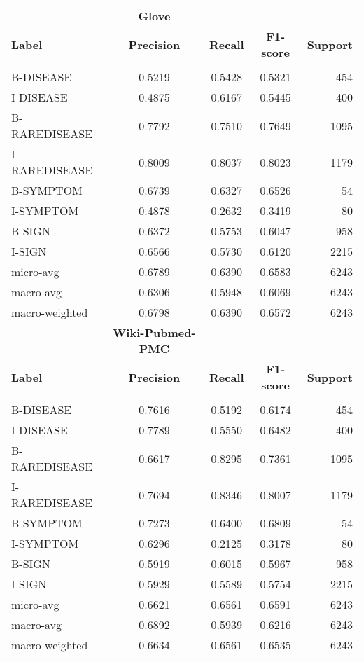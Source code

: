 \documentclass[preprint,12pt]{elsarticle}
\begin{document}
\begin{table}[H]
\begin{tabular}{lcccr}
\hline

& \multicolumn{1}{c}{\textbf{Glove}} \\
{\bf Label} & {\bf Precision} &
{\bf Recall} &
{\bf F1-score} & {\bf Support} \\
\hline\\[-8pt]
B-DISEASE	&	0.5219	&	0.5428	&	0.5321	&	454\\
I-DISEASE	&	0.4875	&	0.6167	&	0.5445	&	400\\
B-RAREDISEASE	&	0.7792	&	0.7510	&	0.7649	&	1095\\
I-RAREDISEASE	&	0.8009	&	0.8037	&	0.8023	&	1179\\
B-SYMPTOM	&	0.6739	&	0.6327	&	0.6526	&	54\\
I-SYMPTOM	&	0.4878	&	0.2632	&	0.3419	&	80\\
B-SIGN	&	0.6372	&	0.5753	&	0.6047	&	958\\
I-SIGN	&	0.6566	&	0.5730	&	0.6120	&	2215
\\micro-avg	&	0.6789	&	0.6390	&	0.6583	&	6243\\macro-avg	&	0.6306	&	0.5948	&	0.6069	&	6243\\
macro-weighted	&	0.6798	&	0.6390	&	0.6572	&	6243\\

\hline
& \multicolumn{1}{c}{\textbf{Wiki-Pubmed-PMC}} \\
{\bf Label} & {\bf Precision} &
{\bf Recall} &
{\bf F1-score} & {\bf Support} \\
\hline\\[-8pt]
B-DISEASE	&	0.7616	&	0.5192	&	0.6174	&	454\\
I-DISEASE	&	0.7789	&	0.5550	&	0.6482	&	400\\
B-RAREDISEASE	&	0.6617	&	0.8295	&	0.7361	&	1095\\
I-RAREDISEASE	&	0.7694	&	0.8346	&	0.8007	&	1179\\
B-SYMPTOM	&	0.7273	&	0.6400	&	0.6809	&	54\\
I-SYMPTOM	&	0.6296	&	0.2125	&	0.3178	&	80\\
B-SIGN	&	0.5919	&	0.6015	&	0.5967	&	958\\
I-SIGN	&	0.5929	&	0.5589	&	0.5754	&	2215\\
micro-avg	&	0.6621	&	0.6561	&	0.6591	&	6243\\
macro-avg	&	0.6892	&	0.5939	&	0.6216	&	6243\\
macro-weighted	&	0.6634	&	0.6561	&	0.6535	&	6243\\
\hline
\end{tabular}
\end{table}
\end{document}

